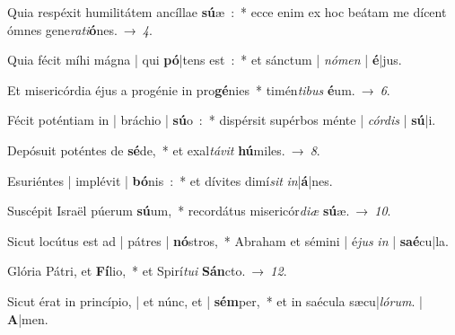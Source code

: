 ﻿\item Quia respéxit humilitátem ancíllae \textbf{sú}æ~:~*
ecce enim ex hoc beátam me dícent ómnes gene\emph{ra}\emph{ti}\textbf{ó}nes.~→~\emph{4}.
\item Quia fécit míhi mágna | qui \textbf{pó}|tens est~:~*
et sánctum | \emph{nó}\emph{men} | \textbf{é}|jus.
\item Et misericórdia éjus a progénie in pro\textbf{gé}nies~*
timén\emph{ti}\emph{bus} \textbf{é}um.~→~\emph{6}.
\item Fécit poténtiam in | bráchio | \textbf{sú}o~:~*
dispérsit supérbos ménte | \emph{cór}\emph{dis} | \textbf{sú}|i.
\item Depósuit poténtes de \textbf{sé}de,~*
et exal\emph{tá}\emph{vit} \textbf{hú}miles.~→~\emph{8}.
\item Esuriéntes | implévit | \textbf{bó}nis~:~*
et dívites dimí\emph{sit} \emph{in}|\textbf{á}|nes.
\item Suscépit Israël púerum \textbf{sú}um,~*
recordátus misericór\emph{di}\emph{æ} \textbf{sú}æ.~→~\emph{10}.
\item Sicut locútus est ad | pátres | \textbf{nó}stros,~*
Abraham et sémini | é\emph{jus} \emph{in} | \textbf{saé}cu|la.
\item Glória Pátri, et \textbf{Fí}lio,~*
et Spirí\emph{tu}\emph{i} \textbf{Sán}cto.~→~\emph{12}.
\item Sicut érat in princípio, | et núnc, et | \textbf{sém}per,~*
et in saécula sæcu|\emph{ló}\emph{rum}. | \textbf{A}|men.
